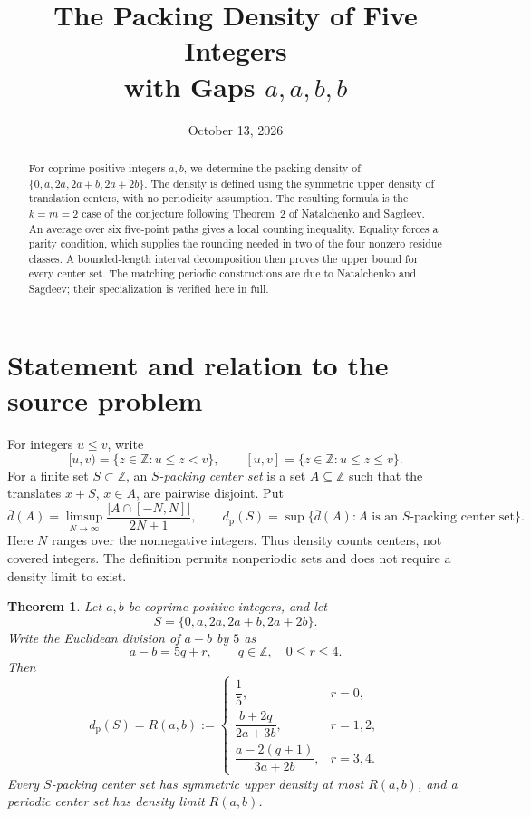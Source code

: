 \documentclass[11pt]{article}
\title{The Packing Density of Five Integers\protect\\with Gaps \(a,a,b,b\)}
\author{}
\date{October 13, 2026}
\newtheorem{theorem}{Theorem}
\theoremstyle{remark}
\newcommand{\Z}{\mathbb Z}
\newcommand{\packd}{d_{\mathrm p}}
\newcommand{\ud}{\overline d}
\begin{document}
\maketitle

\begin{abstract}
For coprime positive integers \(a,b\), we determine the packing density of
\(\{0,a,2a,2a+b,2a+2b\}\). The density is defined using the symmetric
upper density of translation centers, with no periodicity assumption.
The resulting formula is the \(k=m=2\) case of the conjecture following
Theorem~2 of Natalchenko and Sagdeev. An average over six five-point paths
gives a local counting inequality. Equality forces a parity condition,
which supplies the rounding needed in two of the four nonzero residue
classes. A bounded-length interval decomposition then proves the upper
bound for every center set. The matching periodic constructions are due
to Natalchenko and Sagdeev; their specialization is verified here in full.
\end{abstract}

\section{Statement and relation to the source problem}

For integers \(u\le v\), write
\[
 [u,v)=\{z\in\Z:u\le z<v\},\qquad
 [u,v]=\{z\in\Z:u\le z\le v\}.
\]
For a finite set \(S\subset\Z\), an \emph{\(S\)-packing center set} is
a set \(A\subseteq\Z\) such that the translates \(x+S\), \(x\in A\),
are pairwise disjoint. Put
\begin{equation}\label{eq:density}
 \ud(A)=\limsup_{N\to\infty}
 \frac{|A\cap[-N,N]|}{2N+1},\qquad
 \packd(S)=\sup\{\ud(A):A\text{ is an }S\text{-packing center set}\}.
\end{equation}
Here \(N\) ranges over the nonnegative integers. Thus density counts
centers, not covered integers. The definition permits nonperiodic sets
and does not require a density limit to exist.

\begin{theorem}\label{thm:main}
Let \(a,b\) be coprime positive integers, and let
\[
 S=\{0,a,2a,2a+b,2a+2b\}.
\]
Write the Euclidean division of \(a-b\) by \(5\) as
\[
 a-b=5q+r,\qquad q\in\Z,\quad 0\le r\le4.
\]
Then
\begin{equation}\label{eq:formula}
 \packd(S)=R(a,b):=
 \begin{cases}
 \dfrac15,&r=0,\\[4pt]
 \dfrac{b+2q}{2a+3b},&r=1,2,\\[6pt]
 \dfrac{a-2(q+1)}{3a+2b},&r=3,4.
 \end{cases}
\end{equation}
Every \(S\)-packing center set has symmetric upper density at most
\(R(a,b)\), and a periodic center set has density limit \(R(a,b)\).
\end{theorem}
\end{document}
